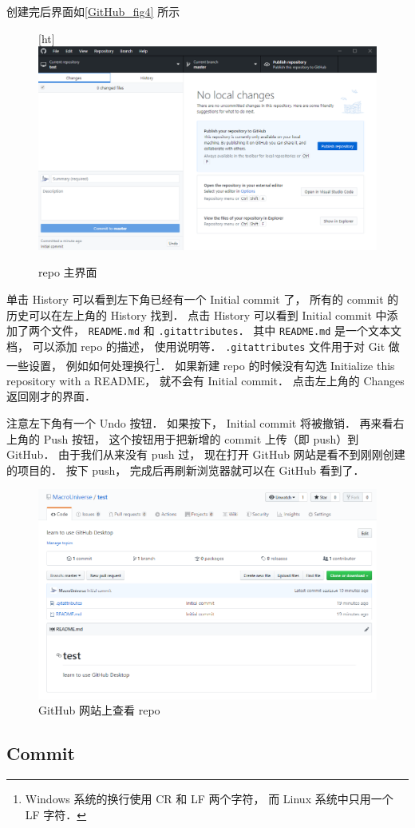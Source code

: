 创建完后界面如\autoref{GitHub_fig4} 所示
\begin{figure}\label{GitHub_fig4}[ht]
\centering
\includegraphics[width=15cm]{./figures/GitHub4.png}
\caption{repo 主界面} \label{GitHub_fig3}
\end{figure}

单击 History 可以看到左下角已经有一个 Initial commit 了， 所有的 commit 的历史可以在左上角的 History 找到． 点击 History 可以看到 Initial commit 中添加了两个文件， \lstinline|README.md| 和 \lstinline|.gitattributes|． 其中 \lstinline|README.md| 是一个文本文档， 可以添加 repo 的描述， 使用说明等． \lstinline|.gitattributes| 文件用于对 Git 做一些设置， 例如如何处理换行\footnote{Windows 系统的换行使用 CR 和 LF 两个字符， 而 Linux 系统中只用一个 LF 字符．}． 如果新建 repo 的时候没有勾选 Initialize this repository with a README， 就不会有 Initial commit． 点击左上角的 Changes 返回刚才的界面．

注意左下角有一个 Undo 按钮． 如果按下， Initial commit 将被撤销． 再来看右上角的 Push 按钮， 这个按钮用于把新增的 commit 上传（即 push）到 GitHub． 由于我们从来没有 push 过， 现在打开 GitHub 网站是看不到刚刚创建的项目的． 按下 push， 完成后再刷新浏览器就可以在 GitHub 看到了．
\begin{figure}[ht]
\centering
\includegraphics[width=15cm]{./figures/GitHub5.png}
\caption{GitHub 网站上查看 repo} \label{GitHub_fig5}
\end{figure}

\subsection{Commit}
